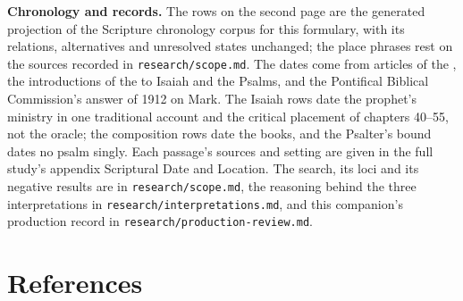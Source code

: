 {\textbf{Chronology and records.} The rows on the second page are the generated
projection of the Scripture chronology corpus for this formulary, with its
relations, alternatives and unresolved states unchanged; the place phrases
rest on the sources recorded in \texttt{research/scope.md}. The dates come from articles of the , the
introductions of the  to Isaiah and
the Psalms, and the Pontifical Biblical Commission's answer of 1912 on Mark.
The Isaiah rows date the prophet's ministry in one traditional account and the
critical placement of chapters 40--55, not the oracle; the composition rows
date the books, and the Psalter's bound dates no psalm singly. Each passage's
sources and setting are given in the full study's appendix Scriptural Date and
Location. The search, its loci and its negative results are in
\texttt{research/scope.md}, the reasoning behind the three interpretations in
\texttt{research/interpretations.md}, and this companion's production record in
\texttt{research/production-review.md}.
\par}

\section*{References}

